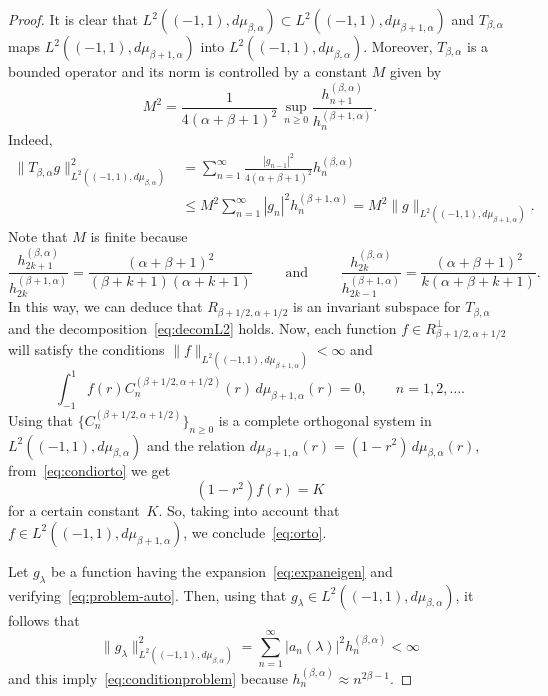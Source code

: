 \documentclass[12pt,a4paper]{amsart}
\theoremstyle{plain}
\theoremstyle{definition}
\begin{document}
\begin{proof}
It is clear that $L^2((-1,1),d\mu_{\beta,\alpha})\subset
L^2((-1,1),d\mu_{\beta+1,\alpha})$ and $T_{\beta,\alpha}$ maps
$L^2((-1,1),d\mu_{\beta+1,\alpha})$ into
$L^2((-1,1),d\mu_{\beta,\alpha})$. Moreover, $T_{\beta,\alpha}$ is
a bounded operator and its norm is controlled by a constant $M$
given by
\[
  M^2 = \frac{1}{4(\alpha+\beta+1)^2} \, \sup_{n\ge0}
  \frac{h_{n+1}^{(\beta,\alpha)}}{h_{n}^{(\beta+1,\alpha)}}.
\]
Indeed,
\begin{align*}
  \|T_{\beta,\alpha}g\|^2_{L^2((-1,1),d\mu_{\beta,\alpha})}
  &= \sum_{n=1}^{\infty}
  \frac{|g_{n-1}|^2}{4(\alpha+\beta+1)^2}h_{n}^{(\beta,\alpha)} \\
  &\le M^2 \sum_{n=1}^{\infty}
  |g_{n}|^2h_{n}^{(\beta+1,\alpha)}
  = M^2\|g\|_{L^2((-1,1),d\mu_{\beta+1,\alpha})}.
\end{align*}
Note that $M$ is finite because
\[
  \frac{h_{2k+1}^{(\beta,\alpha)}}{h_{2k}^{(\beta+1,\alpha)}}
  = \frac{(\alpha+\beta+1)^2}{(\beta+k+1)(\alpha+k+1)}
  \qquad\text{ and }\qquad
  \frac{h_{2k}^{(\beta,\alpha)}}{h_{2k-1}^{(\beta+1,\alpha)}}
  =\frac{(\alpha+\beta+1)^2}{k(\alpha+\beta+k+1)}.
\]
In this way, we can deduce that $R_{\beta+1/2,\alpha+1/2}$ is an
invariant subspace for $T_{\beta,\alpha}$ and the
decomposition~\eqref{eq:decomL2} holds. Now, each
function $f\in R_{\beta+1/2,\alpha+1/2}^\bot$ will satisfy the
conditions $\|f\|_{L^2((-1,1),d\mu_{\beta+1,\alpha})}<\infty$ and
\begin{equation}
\label{eq:condiorto}
  \int_{-1}^{1} f(r) C_{n}^{(\beta+1/2,\alpha+1/2)}(r) 
  \, d\mu_{\beta+1,\alpha}(r) = 0,
  \qquad n=1,2,\dots.
\end{equation}
Using that $\{C_{n}^{(\beta+1/2,\alpha+1/2)}\}_{n\ge 0}$ is a
complete orthogonal system in
$L^2((-1,1),d\mu_{\beta,\alpha})$ and the relation
$d\mu_{\beta+1,\alpha}(r) = (1-r^2)\,d\mu_{\beta,\alpha}(r)$, 
from~\eqref{eq:condiorto} we get
\[
  (1-r^2)f(r) = K
\]
for a certain constant~$K$. So, taking into account that $f\in
L^2((-1,1),d\mu_{\beta+1,\alpha})$, we conclude~\eqref{eq:orto}.

Let $g_\lambda$ be a function having the expansion~\eqref{eq:expaneigen} 
and verifying~\eqref{eq:problem-auto}. Then,
using that $g_{\lambda}\in L^2((-1,1),d\mu_{\beta,\alpha})$,
it follows that
\[
  \|g_\lambda\|^2_{L^2((-1,1),d\mu_{\beta,\alpha})}
  = \sum_{n=1}^\infty |a_n(\lambda)|^2h_{n}^{(\beta,\alpha)} < \infty
\]
and this imply~\eqref{eq:conditionproblem} because
$h_{n}^{(\beta,\alpha)} \approx n^{2\beta-1}$.


\end{proof}
\end{document}
